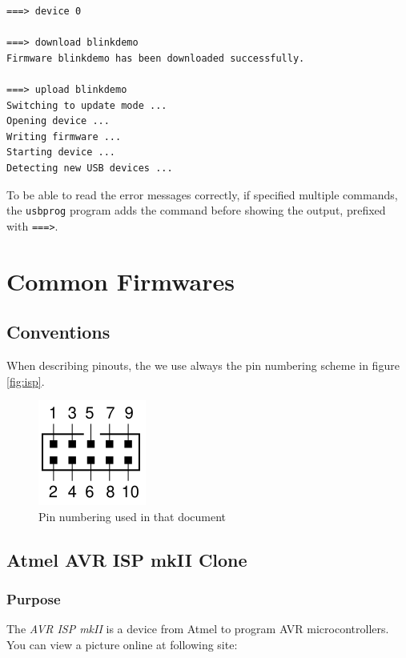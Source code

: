 \documentclass[bibtotoc,UKenglish,halfparskip,oneside,DIV12]{scrreprt}
\begin{document}
\begin{lstlisting}[style=inline]
% usbprog device 0 download blinkdemo upload blinkdemo
===> device 0

===> download blinkdemo
Firmware blinkdemo has been downloaded successfully.

===> upload blinkdemo
Switching to update mode ...
Opening device ...
Writing firmware ...
Starting device ...
Detecting new USB devices ...
\end{lstlisting}

To be able to read the error messages correctly, if specified multiple commands, the
\texttt{usbprog} program adds the command before showing the output, prefixed with \texttt{===>}.

\chapter{Common Firmwares}
\label{sec:commonfirmwares}

\section{Conventions}

When describing pinouts, the we use always the pin numbering scheme in figure \vref{fig:isp}.

\begin{figure}[hb]
  \centering
  \includegraphics{images/isp}
  \caption{Pin numbering used in that document}
  \label{fig:isp}
\end{figure}

\section{Atmel AVR ISP mkII Clone}

\subsection{Purpose}

The \emph{AVR ISP mkII} is a device from Atmel to program AVR microcontrollers. You can view a
picture online at following site:
\end{document}
